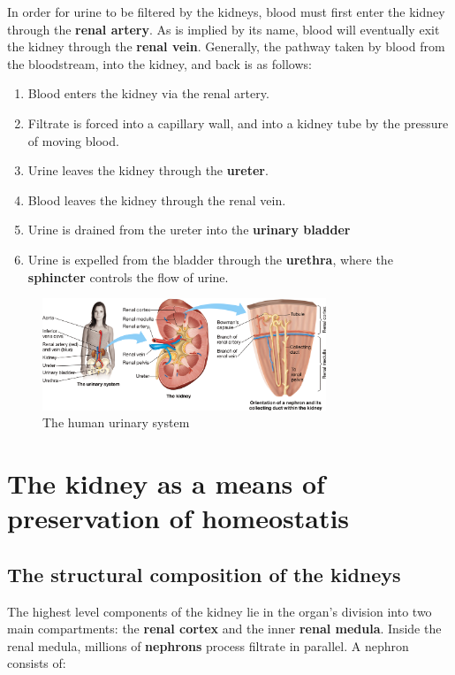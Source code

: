 \documentclass{article}
\begin{document}
In order for urine to be filtered by the kidneys, blood must first enter the
kidney through the \textbf{renal artery}. As is implied by its name, blood will
eventually exit the kidney through the \textbf{renal vein}. Generally, the
pathway taken by blood from the bloodstream, into the kidney, and back is as
follows:

\begin{enumerate}
	\item Blood enters the kidney via the renal artery.
	\item Filtrate is forced into a capillary wall, and into a kidney tube by
		the pressure of moving blood.
	\item Urine leaves the kidney through the \textbf{ureter}.
	\item Blood leaves the kidney through the renal vein.
	\item Urine is drained from the ureter into the \textbf{urinary bladder}
	\item Urine is expelled from the bladder through the \textbf{urethra},
		where the \textbf{sphincter} controls the flow of urine.
\end{enumerate}

\begin{figure}[h]
	\centering
	\includegraphics[width=8.5cm]{urinary_system.png}
	\caption{The human urinary system}
\end{figure}

\section{The kidney as a means of preservation of homeostatis}

\subsection{The structural composition of the kidneys}

The highest level components of the kidney lie in the organ's division into two
main compartments: the \textbf{renal cortex} and the inner \textbf{renal
medula}. Inside the renal medula, millions of \textbf{nephrons} process
filtrate in parallel. A nephron consists of:
\end{document}
